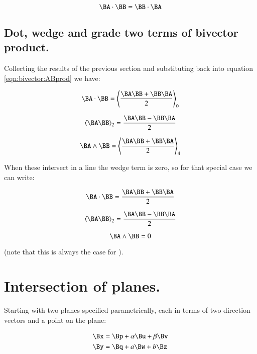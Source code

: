 \begin{equation}
\label{eqn:bivector:dotsign}
\BA \cdot \BB = \BB \cdot \BA
\end{equation}

\subsection{Dot, wedge and grade two terms of bivector product. }

Collecting the results of the previous section and substituting back into equation \ref{eqn:bivector:ABprod} we have:

\begin{equation}
\label{eqn:bivector:AdotB}
\BA \cdot \BB = \gpgrade{\frac{\BA \BB + \BB\BA}{2}}{0}
\end{equation}

\begin{equation}
\label{eqn:bivector:AtwoB}
\gpgradetwo{\BA \BB} = \frac{\BA \BB - \BB\BA}{2}
\end{equation}

\begin{equation}
\label{eqn:bivector:AwedgeB}
\BA \wedge \BB = \gpgrade{\frac{\BA \BB + \BB\BA}{2}}{4}
\end{equation}

When these intersect in a line the wedge term is zero, so for that special case we can write:

\begin{equation*}
\BA \cdot \BB = \frac{\BA \BB + \BB\BA}{2}
\end{equation*}

\begin{equation*}
\gpgradetwo{\BA \BB} = \frac{\BA \BB - \BB\BA}{2}
\end{equation*}

\begin{equation*}
\BA \wedge \BB = 0
\end{equation*}

(note that this is always the case for ).

\section{Intersection of planes. }

Starting with two planes specified parametrically, each in terms of two direction vectors and a point on the plane:

\begin{align}
\label{eqn:bivector:twoplanes}
\Bx &= \Bp + \alpha \Bu + \beta \Bv \\
\By &= \Bq + a \Bw + b \Bz 
\end{align}

